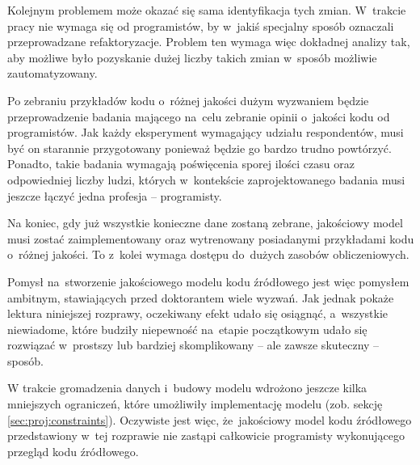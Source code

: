 \documentclass[twoside]{praca}
\begin{document}
Kolejnym problemem może okazać się sama identyfikacja tych zmian. W~trakcie pracy nie wymaga się od programistów, by w~jakiś specjalny sposób oznaczali przeprowadzane refaktoryzacje.
Problem ten wymaga więc dokładnej analizy tak, aby możliwe było pozyskanie dużej liczby takich zmian w~sposób możliwie zautomatyzowany.

Po zebraniu przykładów kodu o~różnej jakości dużym wyzwaniem będzie przeprowadzenie badania mającego na~celu zebranie opinii o~jakości kodu od programistów. Jak każdy eksperyment wymagający udziału respondentów, musi być on starannie przygotowany ponieważ będzie go bardzo trudno powtórzyć. Ponadto, takie badania wymagają poświęcenia sporej ilości czasu oraz odpowiedniej liczby ludzi, których w~kontekście zaprojektowanego badania musi jeszcze łączyć jedna profesja -- programisty.

Na koniec, gdy już wszystkie konieczne dane zostaną zebrane, jakościowy model musi zostać zaimplementowany oraz wytrenowany posiadanymi przykładami kodu o~różnej jakości. To z~kolei wymaga dostępu do~dużych zasobów obliczeniowych.

Pomysł na~stworzenie jakościowego modelu kodu źródłowego jest więc pomysłem ambitnym, stawiających przed doktorantem wiele wyzwań. Jak jednak pokaże lektura niniejszej rozprawy, oczekiwany efekt udało się osiągnąć, a~wszystkie niewiadome, które budziły niepewność na~etapie początkowym udało się rozwiązać w~prostszy lub bardziej skomplikowany -- ale zawsze skuteczny -- sposób.

W trakcie gromadzenia danych i~budowy modelu wdrożono jeszcze kilka mniejszych ograniczeń, które umożliwiły implementację modelu (zob. sekcję \ref{sec:proj:constraints}). Oczywiste jest więc, że~jakościowy model kodu źródłowego przedstawiony w~tej rozprawie nie zastąpi całkowicie programisty wykonującego przegląd kodu źródłowego.


\end{document}
